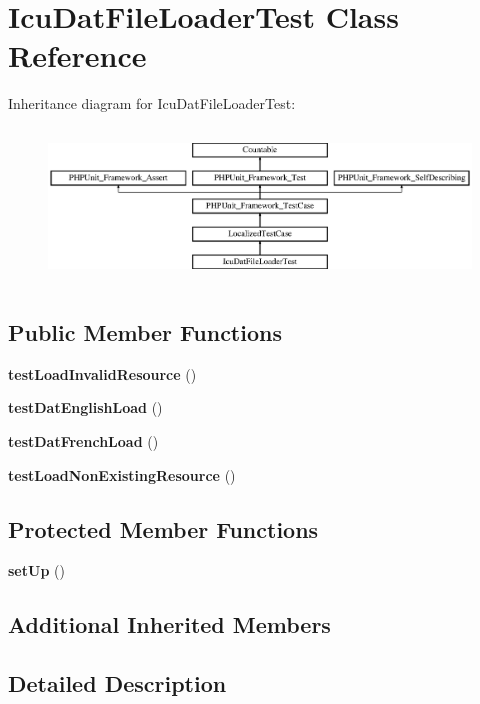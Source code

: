 \section{Icu\+Dat\+File\+Loader\+Test Class Reference}
\label{class_symfony_1_1_component_1_1_translation_1_1_tests_1_1_loader_1_1_icu_dat_file_loader_test}
Inheritance diagram for Icu\+Dat\+File\+Loader\+Test\+:\begin{figure}[H]
\begin{center}
\leavevmode
\includegraphics[height=4.129793cm]{class_symfony_1_1_component_1_1_translation_1_1_tests_1_1_loader_1_1_icu_dat_file_loader_test}
\end{center}
\end{figure}
\subsection*{Public Member Functions}
\begin{DoxyCompactItemize}
\item 
{\bf test\+Load\+Invalid\+Resource} ()
\item 
{\bf test\+Dat\+English\+Load} ()
\item 
{\bf test\+Dat\+French\+Load} ()
\item 
{\bf test\+Load\+Non\+Existing\+Resource} ()
\end{DoxyCompactItemize}
\subsection*{Protected Member Functions}
\begin{DoxyCompactItemize}
\item 
{\bf set\+Up} ()
\end{DoxyCompactItemize}
\subsection*{Additional Inherited Members}


\subsection{Detailed Description}


